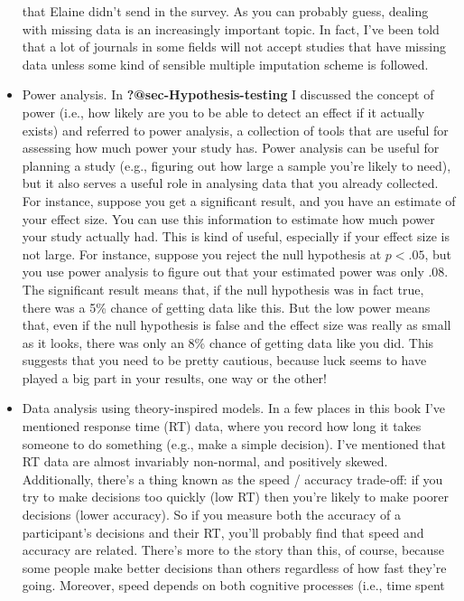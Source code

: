 \documentclass[
  a4paper,
]{book}
\begin{document}
\begin{itemize}
  that Elaine didn't send in the survey. As you can probably guess,
  dealing with missing data is an increasingly important topic. In fact,
  I've been told that a lot of journals in some fields will not accept
  studies that have missing data unless some kind of sensible multiple
  imputation scheme is followed.
\item
  Power analysis. In \textbf{?@sec-Hypothesis-testing} I discussed the
  concept of power (i.e., how likely are you to be able to detect an
  effect if it actually exists) and referred to power analysis, a
  collection of tools that are useful for assessing how much power your
  study has. Power analysis can be useful for planning a study (e.g.,
  figuring out how large a sample you're likely to need), but it also
  serves a useful role in analysing data that you already collected. For
  instance, suppose you get a significant result, and you have an
  estimate of your effect size. You can use this information to estimate
  how much power your study actually had. This is kind of useful,
  especially if your effect size is not large. For instance, suppose you
  reject the null hypothesis at \(p< .05\), but you use power analysis
  to figure out that your estimated power was only .08. The significant
  result means that, if the null hypothesis was in fact true, there was
  a 5\% chance of getting data like this. But the low power means that,
  even if the null hypothesis is false and the effect size was really as
  small as it looks, there was only an 8\% chance of getting data like
  you did. This suggests that you need to be pretty cautious, because
  luck seems to have played a big part in your results, one way or the
  other!
\item
  Data analysis using theory-inspired models. In a few places in this
  book I've mentioned response time (RT) data, where you record how long
  it takes someone to do something (e.g., make a simple decision). I've
  mentioned that RT data are almost invariably non-normal, and
  positively skewed. Additionally, there's a thing known as the speed /
  accuracy trade-off: if you try to make decisions too quickly (low RT)
  then you're likely to make poorer decisions (lower accuracy). So if
  you measure both the accuracy of a participant's decisions and their
  RT, you'll probably find that speed and accuracy are related. There's
  more to the story than this, of course, because some people make
  better decisions than others regardless of how fast they're going.
  Moreover, speed depends on both cognitive processes (i.e., time spent

\end{itemize}
\end{document}

